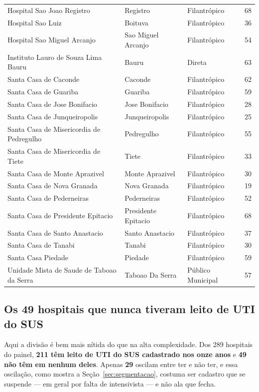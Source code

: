 {\begin{longtable}{p{}p{}lr}
Hospital Sao Joao Registro & Registro & Filantrópico & 68 \\
Hospital Sao Luiz & Boituva & Filantrópico & 36 \\
Hospital Sao Miguel Arcanjo & Sao Miguel Arcanjo & Filantrópico & 54 \\
Instituto Lauro de Souza Lima Bauru & Bauru & Direta & 63 \\
Santa Casa de Caconde & Caconde & Filantrópico & 62 \\
Santa Casa de Guariba & Guariba & Filantrópico & 59 \\
Santa Casa de Jose Bonifacio & Jose Bonifacio & Filantrópico & 28 \\
Santa Casa de Junqueiropolis & Junqueiropolis & Filantrópico & 25 \\
Santa Casa de Misericordia de Pedregulho & Pedregulho & Filantrópico & 55 \\
Santa Casa de Misericordia de Tiete & Tiete & Filantrópico & 33 \\
Santa Casa de Monte Aprazivel & Monte Aprazivel & Filantrópico & 30 \\
Santa Casa de Nova Granada & Nova Granada & Filantrópico & 19 \\
Santa Casa de Pederneiras & Pederneiras & Filantrópico & 52 \\
Santa Casa de Presidente Epitacio & Presidente Epitacio & Filantrópico & 68 \\
Santa Casa de Santo Anastacio & Santo Anastacio & Filantrópico & 37 \\
Santa Casa de Tanabi & Tanabi & Filantrópico & 30 \\
Santa Casa Piedade & Piedade & Filantrópico & 59 \\
Unidade Mista de Saude de Taboao da Serra & Taboao Da Serra & Público Municipal & 57 \\
\end{longtable}}

\subsection{Os 49 hospitais que nunca tiveram leito de UTI do SUS}
\label{ap:listauti}

Aqui a divisão é bem mais nítida do que na alta complexidade. Dos 289
hospitais do painel, \textbf{211 têm leito de UTI do SUS cadastrado nos
onze anos} e \textbf{49 não têm em nenhum deles}. Apenas \textbf{29}
oscilam entre ter e não ter, e essa oscilação, como mostra a
Seção~\ref{sec:segmentacao}, costuma ser cadastro que se suspende --- em
geral por falta de intensivista --- e não ala que fecha.

